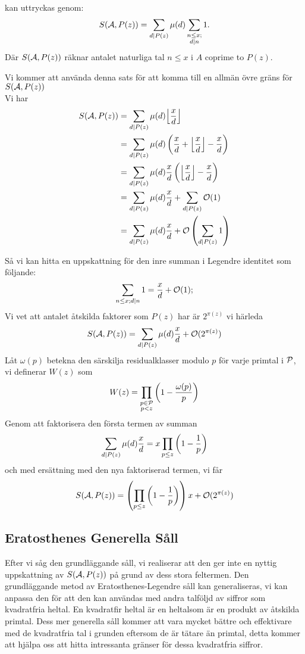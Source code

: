 \begin{theorem} kan uttryckas genom:
\[S(\A, P(z))=\sum_{d\divides P(z)}\mu(d)\sum_{\substack{n\leq x;\\d\divides n}}1. \]
Där  $ S(\A, P(z)) $ räknar antalet naturliga tal $ n\leq x $ i $ A $ coprime to $ P(z) $.
\end{theorem}
Vi kommer att använda denna sats för att komma till en allmän övre gräns för $ S(\A, P(z)) $\\
Vi har
\begin{align*}
S(\A, P(z)) & =\sum_{d\divides P(z)}\mu(d)\Bigl\lfloor \frac{x}{d}\Bigr\rfloor\\
 &  =\sum_{d\divides P(z)}\mu(d) \left( \frac{x}{d}+ \Bigl\lfloor \frac{x}{d} \Bigr\rfloor - \frac{x}{d} \right)\\
 & =\sum_{d\divides P(z)}\mu(d)\frac{x}{d} \left(\Bigl\lfloor\frac{x}{d}\Bigr\rfloor-\frac{x}{d}\right)\\
 & =\sum_{d\divides P(z)}\mu(d)\frac{x}{d}+\sum_{d\divides P(z)}\mathcal{O}(1)\\
 & =\sum_{d\divides P(z)}\mu(d)\frac{x}{d}+ \mathcal{O}\left(\sum_{d\divides P(z)}1\right)
\end{align*}

Så vi kan hitta en uppskattning för den inre summan i Legendre identitet som följande:
\[\sum_{n\leq x;d\divides n}1=\frac{x}{d}+\mathcal{O}(1); \]
Vi vet att antalet åtskilda faktorer som $ P(z) $ har är $ 2^{\pi(z)} $ vi härleda
\[S(\A, P(z))=\sum_{d\divides P(z)}\mu(d)\frac{x}{d}+ \mathcal{O}(2^{\pi(z)}) \]
Låt $ \omega(p) $ betekna den särskilja residualklasser modulo $ p $  för varje primtal i $ \P $, vi definerar $ W(z) $ som
\[W(z)=\prod_{\substack{p\in \P\\p<z}}\left( 1-\frac{\omega(p)}{p}\right)\]
Genom att faktorisera den första termen av summan 
\[\sum_{d\divides P(z)}\mu(d)\frac{x}{d}= x\prod_{p\leq z}\left( 1-\frac{1}{p} \right) \]
och med ersättning med den nya faktoriserad termen, vi får
\[S(\A, P(z))=\left( \prod_{p\leq z}\left( 1-\frac{1}{p} \right)\right) x +\mathcal{O}(2^{\pi(z)}) \]




\subsection{Eratosthenes Generella Såll}
Efter vi såg den grundläggande såll, vi realiserar att den ger inte en nyttig uppskattning av $ S(\A, P(z)) $ på grund av dess stora feltermen. Den grundläggande metod av Eratosthenes-Legendre såll kan generaliseras, vi kan anpassa den för att den kan användas med andra talföljd av siffror som kvadratfria heltal. En kvadratfir heltal är en heltalsom är en produkt av åtskilda primtal. Dess mer generella såll kommer att vara mycket bättre och effektivare med de kvadratfria tal i grunden eftersom de är tätare än primtal, detta kommer att hjälpa oss att hitta intressanta gränser för dessa kvadratfria siffror.

